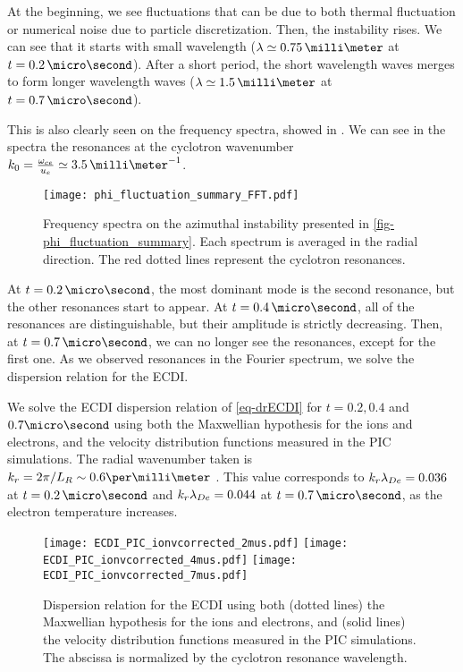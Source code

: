     At the beginning, we see fluctuations that can be due to both thermal fluctuation \citep{salpeter1960} or numerical noise due to particle discretization.
    Then, the instability rises.
    We can see that it starts with small wavelength ($\lambda \simeq 0.75\,\milli\meter$ at $t=0.2\,\micro\second$).
    After a short period, the short wavelength waves merges to form longer wavelength waves  ($\lambda \simeq 1.5\,\milli\meter$ at $t=0.7\,\micro\second$).
    
    This is also clearly seen on the frequency spectra, showed in .
    We can see in the spectra the resonances at the cyclotron wavenumber $k_0 = \frac{\oce}{u_e} \simeq 3.5\,\milli\meter^{-1}$.
    
    \begin{figure}[hbt]
      \centering
      \texttt{[image: phi\_fluctuation\_summary\_FFT.pdf]}
      \caption{Frequency spectra on the azimuthal instability presented in \cref{fig-phi_fluctuation_summary}. Each spectrum is averaged in the radial direction. The red dotted lines represent the cyclotron resonances.}
      \label{fig-phi_fluctuation_summary_FFT}
    \end{figure}
    
    At $t=0.2\,\micro\second$, the most dominant mode is the second resonance, but the other resonances start to appear.
    At $t=0.4\,\micro\second$, all of the resonances are distinguishable, but their amplitude is strictly decreasing.
    Then, at $t=0.7\,\micro\second$, we can no longer see the resonances, except for the first one.
    As we observed resonances in the Fourier spectrum, we solve the dispersion relation for the \ac{ECDI}.
    
    \vspace{1em}
    We solve the \ac{ECDI} dispersion relation of \cref{eq-drECDI} for $t=0.2, 0.4$ and $0.7\micro\second$ using both the Maxwellian hypothesis for the ions and electrons, and the velocity distribution functions measured in the \ac{PIC} simulations.
    The radial wavenumber taken is $k_r = 2 \pi/L_R \sim 0.6 \per\milli\meter$ \citep{lafleur2016,janhunen2018}.
    This value corresponds to $k_r \lambda_{De} = 0.036$ at $t=0.2\,\micro\second$ and $k_r \lambda_{De} = 0.044$ at $t=0.7\,\micro\second$, as the electron temperature increases.
    
    \begin{figure}[hbt]
      \centering
        \texttt{[image: ECDI\_PIC\_ionvcorrected\_2mus.pdf]} 
        \texttt{[image: ECDI\_PIC\_ionvcorrected\_4mus.pdf]} 
        \texttt{[image: ECDI\_PIC\_ionvcorrected\_7mus.pdf]} 
      \caption{Dispersion relation for the \ac{ECDI} using both (dotted lines) the Maxwellian hypothesis for the ions and electrons, and (solid lines) the velocity distribution functions measured in the \ac{PIC} simulations. The abscissa is normalized by the cyclotron resonance wavelength.}
      \label{fig-DRECDI}
    \end{figure}
    
